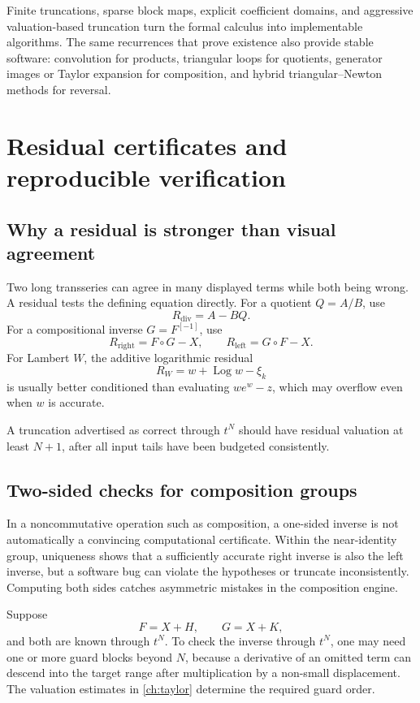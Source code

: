 \documentclass[11pt,openany]{book}
\theoremstyle{definition}
\theoremstyle{plain}
\theoremstyle{remark}
\newcommand{\invcomp}{^{[-1]}}
\DeclareMathOperator{\Log}{Log}
\begin{document}
\begin{summarybox}
Finite truncations, sparse block maps, explicit coefficient domains, and aggressive valuation-based truncation turn the formal calculus into implementable algorithms. The same recurrences that prove existence also provide stable software: convolution for products, triangular loops for quotients, generator images or Taylor expansion for composition, and hybrid triangular--Newton methods for reversal.
\end{summarybox}

\chapter{Residual certificates and reproducible verification}\label{ch:verification}

\section{Why a residual is stronger than visual agreement}
Two long transseries can agree in many displayed terms while both being wrong. A residual tests the defining equation directly. For a quotient \(Q=A/B\), use
\[
 R_{\mathrm{div}}=A-BQ.
\]
For a compositional inverse \(G=F\invcomp\), use
\[
 R_{\mathrm{right}}=F\circ G-X,
 \qquad
 R_{\mathrm{left}}=G\circ F-X.
\]
For Lambert \(W\), the additive logarithmic residual
\[
 R_W=w+\Log w-\xi_k
\]
is usually better conditioned than evaluating \(we^w-z\), which may overflow even when \(w\) is accurate.

A truncation advertised as correct through \(t^N\) should have residual valuation at least \(N+1\), after all input tails have been budgeted consistently.


\section{Two-sided checks for composition groups}
In a noncommutative operation such as composition, a one-sided inverse is not automatically a convincing computational certificate. Within the near-identity group, uniqueness shows that a sufficiently accurate right inverse is also the left inverse, but a software bug can violate the hypotheses or truncate inconsistently. Computing both sides catches asymmetric mistakes in the composition engine.

Suppose
\[
 F=X+H,\qquad G=X+K,
\]
and both are known through \(t^N\). To check the inverse through \(t^N\), one may need one or more guard blocks beyond \(N\), because a derivative of an omitted term can descend into the target range after multiplication by a non-small displacement. The valuation estimates in \cref{ch:taylor} determine the required guard order.
\end{document}
